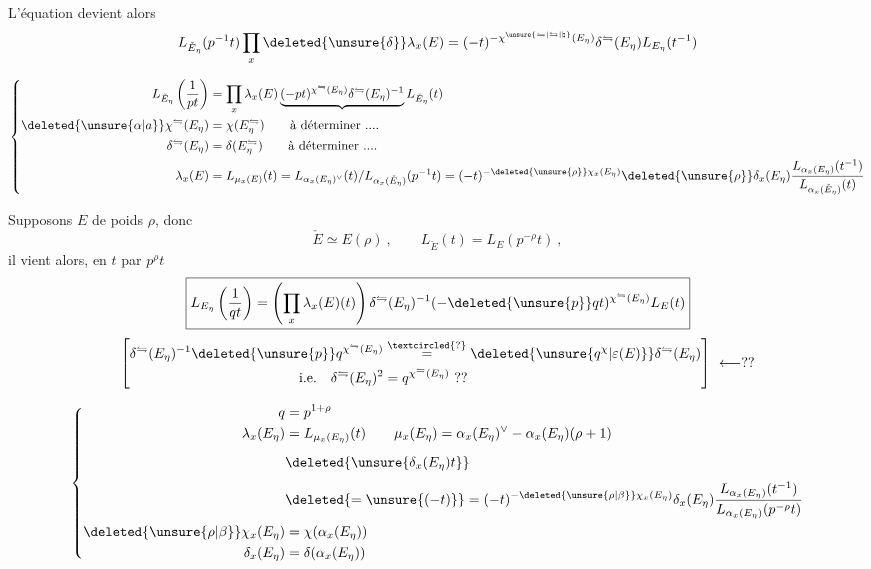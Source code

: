 L'équation  devient alors
\[
L_{\check E_\eta}(p^{-1}t)\prod_x\deleted{\unsure{\delta}}\lambda_x(E)=(-t)^{-\chi^{\unsure{\leftrightharpoons|\leftrightarrows|\natural}}(E_\eta)}\delta^{\leftrightharpoons}(E_\eta)L_{E_\eta}(t^{-1})
\]

\[
\left\{\begin{aligned}
L_{\check E_\eta}\left(\frac1{pt}\right)&=\prod_x\lambda_x(E)\underbrace{(-pt)^{\chi^{\leftrightharpoons}(E_\eta)}\delta^{\leftrightharpoons}(E_\eta)^{-1}}L_{\check E_\eta}(t)\\
\deleted{\unsure{\alpha|a}}\chi^{\leftrightharpoons}(E_\eta)&=\chi(E_\eta^{\leftrightharpoons})\qquad \text{à déterminer ....}\\
\delta^{\leftrightharpoons}(E_\eta)&=\delta(E_\eta^{\leftrightharpoons})\qquad \text{à déterminer ....}\\
\lambda_x(E)&=L_{\mu_x(E)}(t)=L_{\alpha_x(E_\eta)^\vee}(t)/L_{\alpha_x(\check E_\eta)}(p^{-1}t)
=(-t)^{-\deleted{\unsure{\rho}}\chi_x(E_\eta)}\deleted{\unsure{\rho}}\delta_x(E_\eta)\frac{L_{\alpha_x(E_\eta)}(t^{-1})}{L_{\alpha_x(\check E_\eta)}(t)}
\end{aligned}\right.
\]

Supposons $E$ de poids $\rho$, donc
\[
\check E\simeq E(\rho)\ ,\qquad L_{\check E}(t)=L_E(p^{-\rho}t)\ ,
\]
il vient alors, en  $t$ par $p^\rho t$
\[
\boxed{L_{E_\eta}\left(\frac1{qt}\right)=\left(\prod_x\lambda_x(E)(t)\right)\delta^{\leftrightharpoons}(E_\eta)^{-1}(-\deleted{\unsure{p}}qt)^{\chi^{\leftrightharpoons}(E_\eta)}L_E(t)}
\]
\[
\left[\begin{aligned}
\delta^{\leftrightharpoons}(E_\eta)^{-1}\deleted{\unsure{p}}q^{\chi^{\leftrightharpoons}(E_\eta)}
&\overset{\textcircled{?}}{=}\deleted{\unsure{q^{\chi}|\varepsilon(E)}}\delta^{\leftrightharpoons}(E_\eta)\\
\text{i.e.}\quad \delta^{\leftrightharpoons}(E_\eta)^2&=q^{\chi^{\leftrightharpoons}(E_\eta)}\ ??
\end{aligned}\right]\ \longleftarrow ??
\]

\[
\left\{\begin{aligned}
q&=p^{1+\rho}\\
\lambda_x(E_\eta)&=L_{\mu_x(E_\eta)}(t)\qquad
\mu_x(E_\eta)=\alpha_x(E_\eta)^\vee-\alpha_x(E_\eta)(\rho+1)\\
&\deleted{\unsure{\delta_x(E_\eta)t}}\vphantom{\frac11}\\
&\deleted{=\unsure{(-t)}}=(-t)^{-\deleted{\unsure{\rho|\beta}}\chi_x(E_\eta)}\delta_x(E_\eta)\frac{L_{\alpha_x(E_\eta)}(t^{-1})}{L_{\alpha_x(E_\eta)}(p^{-\rho}t)}\\
\deleted{\unsure{\rho|\beta}}\chi_x(E_\eta)&=\chi(\alpha_x(E_\eta))\\
\delta_x(E_\eta)&=\delta(\alpha_x(E_\eta))
\end{aligned}\right.
\]

